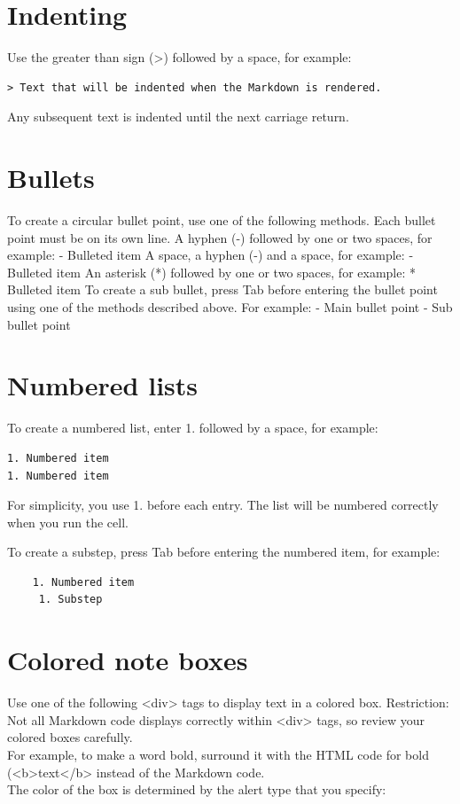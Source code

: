 \section{Indenting}
Use the greater than sign (>) followed by a space, for example:
\begin{verbatim}
> Text that will be indented when the Markdown is rendered. 
\end{verbatim}
Any subsequent text is indented until the next carriage return.

\section{Bullets}
To create a circular bullet point, use one of the following methods. Each bullet point must be on its own line.
A hyphen (-) followed by one or two spaces, for example: - Bulleted item
A space, a hyphen (-) and a space, for example: - Bulleted item
An asterisk (*) followed by one or two spaces, for example: * Bulleted item
To create a sub bullet, press Tab before entering the bullet point using one of the methods described above. For example:
- Main bullet point
     - Sub bullet point

\section{Numbered lists}
To create a numbered list, enter 1. followed by a space, for example:
\begin{verbatim}
1. Numbered item
1. Numbered item   
\end{verbatim}

For simplicity, you use 1. before each entry. The list will be numbered correctly when you run the cell.

To create a substep, press Tab before entering the numbered item, for example:
\begin{verbatim}
    1. Numbered item
     1. Substep
\end{verbatim}

\section{Colored note boxes}
Use one of the following <div> tags to display text in a colored box.
Restriction: Not all Markdown code displays correctly within <div> tags, so review your colored boxes carefully.\\
For example, to make a word bold, surround it with the HTML code for bold (<b>text</b> instead of the Markdown code.\\
The color of the box is determined by the alert type that you specify:
